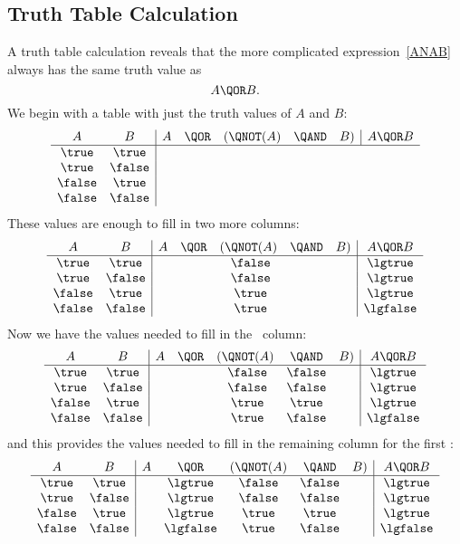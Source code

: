 \subsection{Truth Table Calculation}
A truth table calculation reveals that the more complicated
expression~\ref{ANAB} always has the same truth value as
\begin{equation}\label{AOB}
A \QOR B.
\end{equation}
We begin with a table with just the truth values of $A$ and $B$:
\[
\begin{array}{cc|ccccc|c}
A      & B      & A  & \QOR  & (\QNOT(A)& \QAND & B) & A \QOR  B \\ \hline
\true  & \true \\
\true  & \false\\
\false & \true \\
\false & \false                       
\end{array}
\]
These values are enough to fill in two more columns:
\[
\begin{array}{cc|ccccc|c}
A      & B      & A & \QOR  & (\QNOT(A) & \QAND & B) & A \QOR  B \\ \hline
\true  & \true  &   &       & \ \false   &       &    & \lgtrue \\
\true  & \false &   &       & \ \false   &       &    & \lgtrue \\
\false & \true  &   &       & \ \true    &       &    & \lgtrue \\
\false & \false &   &       & \ \true    &       &    & \lgfalse\\
\end{array}
\]
Now we have the values needed to fill in the \QAND\ column:
\[
\begin{array}{cc|ccccc|c}
A      & B      & A & \QOR  & (\QNOT(A) & \QAND   & B) & A \QOR  B \\ \hline
\true  & \true  &   &       & \ \false   &  \false &    & \lgtrue \\
\true  & \false &   &       & \ \false   &  \false &    & \lgtrue \\
\false & \true  &   &       & \ \true    &  \true  &    & \lgtrue \\
\false & \false &   &       & \ \true    &  \false &    & \lgfalse\\
\end{array}
\]
and this provides the values needed to fill in the remaining column for the first \QOR:
\[
\begin{array}{cc|ccccc|c}
A      & B      & A & \QOR     &(\QNOT(A) & \QAND   & B) & A \QOR  B \\ \hline
\true  & \true  &   & \lgtrue  & \false &    \false &    & \lgtrue \\
\true  & \false &   & \lgtrue  & \false &    \false &    & \lgtrue \\
\false & \true  &   & \lgtrue  & \true  &    \true  &    & \lgtrue \\
\false & \false &   & \lgfalse & \true  &    \false &    & \lgfalse\\
\end{array}
\]
